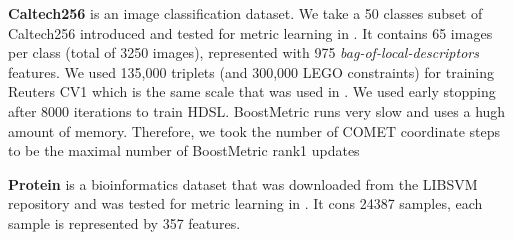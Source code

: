 \documentclass{article}
\begin{document}
\textbf{Caltech256} is an image classification dataset.   We take a 50 classes subset of Caltech256 introduced and tested for metric learning in \cite{oasis}. It contains 65 images per class (total of 3250 images), represented with 975 \textit{bag-of-local-descriptors} features. We used 135,000 triplets (and 300,000 LEGO constraints) for training Reuters CV1 which is the same scale that was used in \cite{oasis}. We used early stopping after 8000 iterations to train HDSL. BoostMetric runs very slow and uses a hugh amount of memory. Therefore, we took the number of COMET coordinate steps to be the maximal number of BoostMetric rank1 updates


\textbf{Protein} is a bioinformatics dataset that was downloaded from the LIBSVM repository \cite{libsvm} and was tested for metric learning  in \cite{qian}. It cons 24387 samples, each sample is represented by 357 features. 
\end{document}
